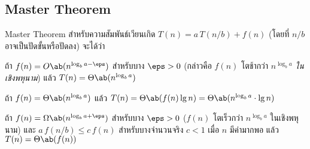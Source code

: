 \subsection{Master Theorem}

\begin{lawbox}[label=01:thm:master]{Master Theorem}
	สำหรับความสัมพันธ์เวียนเกิด $T(n) = a\,T(n/b) + f(n)$ (โดยที่ $n/b$ อาจเป็นปัดขั้นหรือปัดลง) จะได้ว่า
	\begin{compactenum}[label=(\roman*)]
		\item ถ้า $f(n) = O\ab(n^{\log_b a - \eps})$ สำหรับบาง $\eps > 0$ (กล่าวคือ $f(n)$ โตช้ากว่า $n^{\log_b a}$ \emph{ในเชิงพหุนาม}) แล้ว $T(n) = \Theta\ab(n^{\log_b a})$
		\item ถ้า $f(n) = \Theta\ab(n^{\log_b a})$ แล้ว $T(n) = \Theta\ab(f(n)\lg n) = \Theta\ab(n^{\log_b a}\cdot\lg n)$
		\item ถ้า $f(n) = \Omega\ab(n^{\log_b a + \eps})$ สำหรับบาง $\eps > 0$ ($f(n)$ โตเร็วกว่า $n^{\log_b a}$ ในเชิงพหุนาม) และ $a\,f(n/b) \leq c\,f(n)$ สำหรับบางจำนวนจริง $c < 1$ เมื่อ $n$ มีค่ามากพอ แล้ว $T(n) = \Theta\ab(f(n))$
	\end{compactenum}
\end{lawbox}
